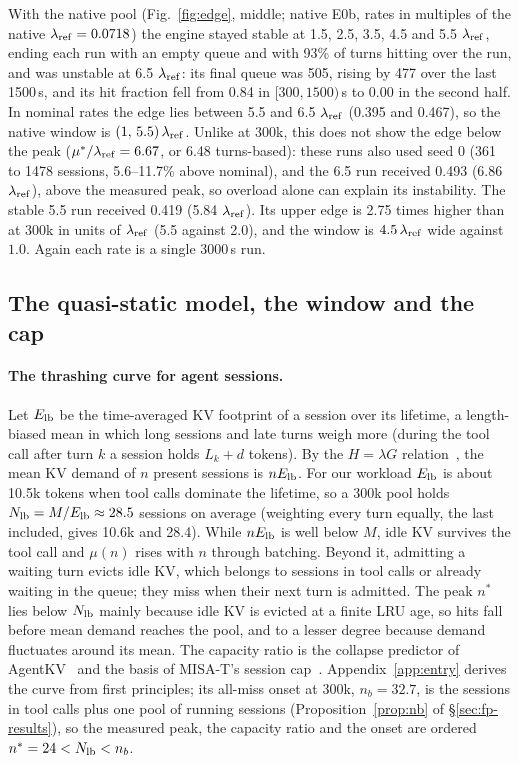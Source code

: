 With the native pool (Fig.~\ref{fig:edge}, middle; native E0b, rates in multiples of the native $\lambda_{\mathrm{ref}}=0.0718$\sps) the engine stayed stable at 1.5, 2.5, 3.5, 4.5 and 5.5 $\lambda_{\mathrm{ref}}$, ending each run with an empty queue and with 93\% of turns hitting over the run, and was unstable at 6.5 $\lambda_{\mathrm{ref}}$: its final queue was 505, rising by 477 over the last 1500\,s, and its hit fraction fell from 0.84 in $[300,1500)$\,s to 0.00 in the second half. In nominal rates the edge lies between 5.5 and 6.5 $\lambda_{\mathrm{ref}}$ (0.395 and 0.467\sps), so the native window is $(1,\,5.5)\,\lambda_{\mathrm{ref}}$. Unlike at 300k, this does not show the edge below the peak ($\mu^*/\lambda_{\mathrm{ref}}=6.67$, or 6.48 turns-based): these runs also used seed 0 (361 to 1478 sessions, 5.6--11.7\% above nominal), and the 6.5 run received 0.493\sps{} (6.86 $\lambda_{\mathrm{ref}}$), above the measured peak, so overload alone can explain its instability. The stable 5.5 run received 0.419\sps{} (5.84 $\lambda_{\mathrm{ref}}$). Its upper edge is 2.75 times higher than at 300k in units of $\lambda_{\mathrm{ref}}$ (5.5 against 2.0), and the window is $4.5\,\lambda_{\mathrm{ref}}$ wide against $1.0$. Again each rate is a single 3000\,s run.

\subsection{The quasi-static model, the window and the cap}\label{app:qs}

\paragraph{The thrashing curve for agent sessions.}\label{sec:theory-curve}
Let $E_{\mathrm{lb}}$ be the time-averaged KV footprint of a session over its lifetime, a length-biased mean in which long sessions and late turns weigh more (during the tool call after turn $k$ a session holds $L_k+d$ tokens). By the $H=\lambda G$ relation~\citep{brumelle1971relation,heyman1980relation}, the mean KV demand of $n$ present sessions is $nE_{\mathrm{lb}}$. For our workload $E_{\mathrm{lb}}$ is about 10.5k tokens when tool calls dominate the lifetime, so a 300k pool holds $N_{\mathrm{lb}}=M/E_{\mathrm{lb}}\approx28.5$ sessions on average (weighting every turn equally, the last included, gives 10.6k and 28.4). While $nE_{\mathrm{lb}}$ is well below $M$, idle KV survives the tool call and $\mu(n)$ rises with $n$ through batching. Beyond it, admitting a waiting turn evicts idle KV, which belongs to sessions in tool calls or already waiting in the queue; they miss when their next turn is admitted. The peak $n^*$ lies below $N_{\mathrm{lb}}$ mainly because idle KV is evicted at a finite LRU age, so hits fall before mean demand reaches the pool, and to a lesser degree because demand fluctuates around its mean. The capacity ratio is the collapse predictor of AgentKV~\citep{anon2026agentkv} and the basis of MISA-T's session cap~\citep{hong2026misat}. Appendix~\ref{app:entry} derives the curve from first principles; its all-miss onset at 300k, $n_b=32.7$, is the sessions in tool calls plus one pool of running sessions (Proposition~\ref{prop:nb} of \S\ref{sec:fp-results}), so the measured peak, the capacity ratio and the onset are ordered $n^*=24<N_{\mathrm{lb}}<n_b$.

